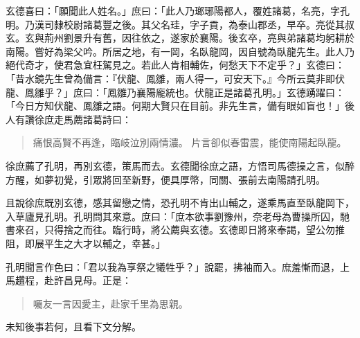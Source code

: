 玄德喜曰：「願聞此人姓名。」庶曰：「此人乃瑯琊陽都人，覆姓諸葛，名亮，字孔明。乃漢司隸校尉諸葛豐之後。其父名珪，字子貢，為泰山郡丞，早卒。亮從其叔玄。玄與荊州劉景升有舊，因往依之，遂家於襄陽。後玄卒，亮與弟諸葛均躬耕於南陽。嘗好為梁父吟。所居之地，有一岡，名臥龍岡，因自號為臥龍先生。此人乃絕代奇才，使君急宜枉駕見之。若此人肯相輔佐，何愁天下不定乎？」玄德曰：「昔水鏡先生曾為備言：『伏龍、鳳雛，兩人得一，可安天下。』今所云莫非即伏龍、鳳雛乎？」庶曰：「鳳雛乃襄陽龐統也。伏龍正是諸葛孔明。」玄德踴躍曰：「今日方知伏龍、鳳雛之語。何期大賢只在目前。非先生言，備有眼如盲也！」後人有讚徐庶走馬薦諸葛詩曰：

\begin{quote}
痛恨高賢不再逢，臨岐泣別兩情濃。
片言卻似春雷震，能使南陽起臥龍。
\end{quote}

徐庶薦了孔明，再別玄德，策馬而去。玄德聞徐庶之語，方悟司馬德操之言，似醉方醒，如夢初覺，引眾將回至新野，便具厚幣，同關、張前去南陽請孔明。

且說徐庶既別玄德，感其留戀之情，恐孔明不肯出山輔之，遂乘馬直至臥龍岡下，入草廬見孔明。孔明問其來意。庶曰：「庶本欲事劉豫州，奈老母為曹操所囚，馳書來召，只得捨之而往。臨行時，將公薦與玄德。玄德即日將來奉謁，望公勿推阻，即展平生之大才以輔之，幸甚。」

孔明聞言作色曰：「君以我為享祭之犧牲乎？」說罷，拂袖而入。庶羞慚而退，上馬趲程，赴許昌見母。正是：

\begin{quote}
囑友一言因愛主，赴家千里為思親。
\end{quote}

未知後事若何，且看下文分解。
